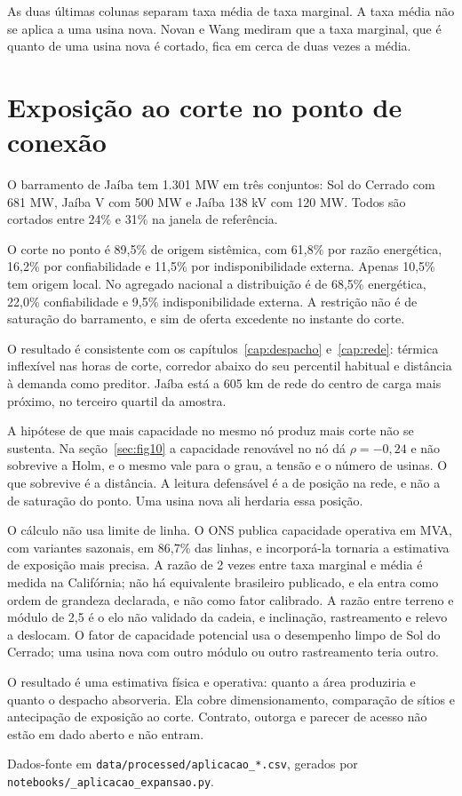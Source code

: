 As duas últimas colunas separam taxa média de taxa marginal. A taxa média não se
aplica a uma usina nova. Novan e Wang \cite{novan2024} mediram que a taxa
marginal, que é quanto de uma usina nova é cortado, fica em cerca de duas vezes
a média.

\section{Exposição ao corte no ponto de conexão}

O barramento de Jaíba tem 1.301 MW em três conjuntos: Sol do Cerrado com 681 MW,
Jaíba V com 500 MW e Jaíba 138 kV com 120 MW. Todos são cortados entre 24\% e
31\% na janela de referência.

O corte no ponto é 89,5\% de origem sistêmica, com 61,8\% por razão energética,
16,2\% por confiabilidade e 11,5\% por indisponibilidade externa. Apenas 10,5\%
tem origem local. No agregado nacional a distribuição é de 68,5\% energética,
22,0\% confiabilidade e 9,5\% indisponibilidade externa. A restrição não é de
saturação do barramento, e sim de oferta excedente no instante do corte.

O resultado é consistente com os capítulos~\ref{cap:despacho}
e~\ref{cap:rede}: térmica inflexível nas horas de corte, corredor abaixo do seu
percentil habitual e distância à demanda como preditor. Jaíba está a 605 km de
rede do centro de carga mais próximo, no terceiro quartil da amostra.

 A hipótese de que mais capacidade
no mesmo nó produz mais corte não se sustenta. Na seção~\ref{sec:fig10} a
capacidade renovável no nó dá $\rho = -0{,}24$ e não sobrevive a Holm, e o mesmo
vale para o grau, a tensão e o número de usinas. O que sobrevive é a distância.
A leitura defensável é a de posição na rede, e não a de saturação do ponto. Uma
usina nova ali herdaria essa posição.

\begin{objecao}
O cálculo não usa limite de linha. O ONS publica capacidade operativa em MVA,
com variantes sazonais, em 86,7\% das linhas, e incorporá-la tornaria a
estimativa de exposição mais precisa. A razão de 2 vezes entre taxa marginal e
média é medida na Califórnia; não há equivalente brasileiro publicado, e ela
entra como ordem de grandeza declarada, e não como fator calibrado. A razão
entre terreno e módulo de 2,5 é o elo não validado da cadeia, e inclinação,
rastreamento e relevo a deslocam. O fator de capacidade potencial usa o
desempenho limpo de Sol do Cerrado; uma usina nova com outro módulo ou outro
rastreamento teria outro.
\end{objecao}

 O resultado é uma estimativa física e operativa: quanto a área
produziria e quanto o despacho absorveria. Ela cobre dimensionamento, comparação
de sítios e antecipação de exposição ao corte. Contrato, outorga e parecer de
acesso não estão em dado aberto e não entram.

{\color{tinta2}\footnotesize Dados-fonte em
\texttt{data/processed/aplicacao\_*.csv}, gerados por
\texttt{notebooks/\_aplicacao\_expansao.py}.}
